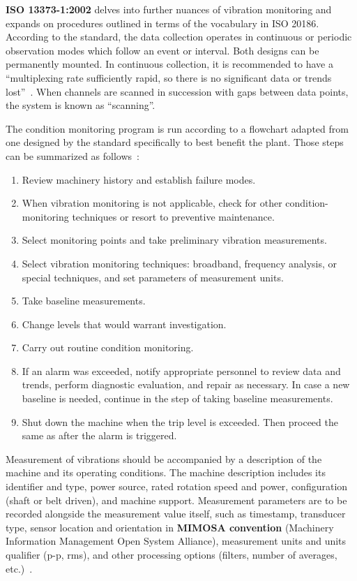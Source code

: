 \textbf{ISO 13373-1:2002} delves into further nuances of vibration monitoring and expands on procedures outlined in terms of the vocabulary in ISO 20186. According to the standard, the data collection operates in continuous or periodic observation modes which follow an event or interval. Both designs can be permanently mounted. In continuous collection, it is recommended to have a ``multiplexing rate sufficiently rapid, so there is no significant data or trends lost''~\cite{noauthor_iso_2002}. When channels are scanned in succession with gaps between data points, the system is known as ``scanning''.

The condition monitoring program is run according to a flowchart adapted from one designed by the standard specifically to best benefit the plant. Those steps can be summarized as follows~\cite{noauthor_iso_2002}:

\begin{enumerate}
\itemsep0pt
\item Review machinery history and establish failure modes.
\item When vibration monitoring is not applicable, check for other condition-monitoring techniques or resort to preventive maintenance.
\item Select monitoring points and take preliminary vibration measurements.
\item Select vibration monitoring techniques: broadband, frequency analysis, or special techniques, and set parameters of measurement units.
\item Take baseline measurements.
\item Change levels that would warrant investigation.
\item Carry out routine condition monitoring.
\item If an alarm was exceeded, notify appropriate personnel to review data and trends, perform diagnostic evaluation, and repair as necessary. In case a new baseline is needed, continue in the step of taking baseline measurements.
\item Shut down the machine when the trip level is exceeded. Then proceed the same as after the alarm is triggered.
\end{enumerate}

Measurement of vibrations should be accompanied by a description of the machine and its operating conditions. The machine description includes its identifier and type, power source, rated rotation speed and power, configuration (shaft or belt driven), and machine support. Measurement parameters are to be recorded alongside the measurement value itself, such as timestamp, transducer type, sensor location and orientation in \textbf{MIMOSA convention} (Machinery Information Management Open System Alliance), measurement units and units qualifier (p-p, rms), and other processing options (filters, number of averages, etc.)~\cite{noauthor_iso_2002}.

